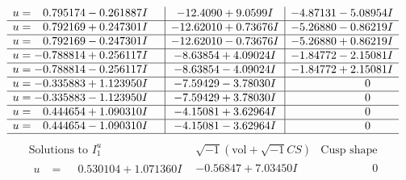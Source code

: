 \documentclass[1p]{elsarticle_modified}
\theoremstyle{definition}
\newcommand{\I}{\sqrt{-1}}
\begin{document}
$$\begin{array}{c|c|c}
\begin{aligned}
u &= \phantom{-}0.795174 - 0.261887 I\end{aligned}
 & -12.4090 + 9.0599 I & -4.87131 - 5.08954 I \\ \hline\begin{aligned}
u &= \phantom{-}0.792169 + 0.247301 I\end{aligned}
 & -12.62010 + 0.73676 I & -5.26880 - 0.86219 I \\ \hline\begin{aligned}
u &= \phantom{-}0.792169 - 0.247301 I\end{aligned}
 & -12.62010 - 0.73676 I & -5.26880 + 0.86219 I \\ \hline\begin{aligned}
u &= -0.788814 + 0.256117 I\end{aligned}
 & -8.63854 + 4.09024 I & -1.84772 - 2.15081 I \\ \hline\begin{aligned}
u &= -0.788814 - 0.256117 I\end{aligned}
 & -8.63854 - 4.09024 I & -1.84772 + 2.15081 I \\ \hline\begin{aligned}
u &= -0.335883 + 1.123950 I\end{aligned}
 & -7.59429 - 3.78030 I & \phantom{-0.000000 } 0 \\ \hline\begin{aligned}
u &= -0.335883 - 1.123950 I\end{aligned}
 & -7.59429 + 3.78030 I & \phantom{-0.000000 } 0 \\ \hline\begin{aligned}
u &= \phantom{-}0.444654 + 1.090310 I\end{aligned}
 & -4.15081 + 3.62964 I & \phantom{-0.000000 } 0 \\ \hline\begin{aligned}
u &= \phantom{-}0.444654 - 1.090310 I\end{aligned}
 & -4.15081 - 3.62964 I & \phantom{-0.000000 } 0\\
 \hline 
 \end{array}$$\newpage$$\begin{array}{c|c|c}  
\text{Solutions to }I^u_{1}& \I (\text{vol} + \sqrt{-1}CS) & \text{Cusp shape}\\
 \hline 
\begin{aligned}
u &= \phantom{-}0.530104 + 1.071360 I\end{aligned}
 & -0.56847 + 7.03450 I & \phantom{-0.000000 } 0 \\ \hline\begin{aligned}

\end{aligned}
\end{array}$$
\end{document}
